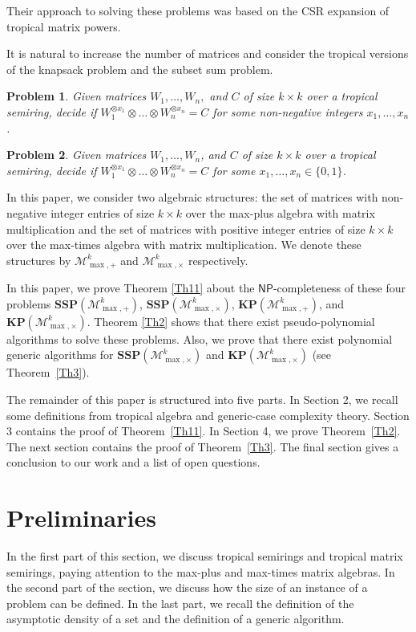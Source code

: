 \documentclass[reqno,12pt]{amsart}
\newtheorem{problem}{Problem}
\theoremstyle{definition}
\newcommand{\NP}{\mathsf{NP}}
\newcommand{\MP}{\mathcal{M}_{\max, {+}}^k}
\newcommand{\MT}{\mathcal{M}_{\max, {\times}}^k}
\newcommand{\SSMPP}{\mathbf{SSP}(\MP)}
\newcommand{\SSMTP}{\mathbf{SSP}(\MT)}
\newcommand{\KMPP}{\mathbf{KP}(\MP)}
\newcommand{\KMTP}{\mathbf{KP}(\MT)}
\begin{document}
Their approach to solving these problems was based on the CSR expansion of tropical matrix powers.

It is natural to increase the number of matrices and consider the tropical versions of the knapsack problem and the subset sum problem.

\begin{problem}\label{TropicalKnapsack}
    Given matrices $W_1, \ldots, W_n,$ and $C$ of size $k \times k$ over a tropical semiring, decide if $W_1^{\otimes x_1} \otimes \ldots \otimes  W_n^{\otimes x_n} = C$ for some non-negative integers $x_1, \ldots, x_n$.
\end{problem}

\begin{problem}\label{TropicalSubsetSum}
    Given matrices $W_1, \ldots, W_n$, and $C$ of size $k \times k$ over a tropical semiring, decide if $W_1^{\otimes x_1} \otimes \ldots \otimes  W_n^{\otimes x_n} = C$ for some $x_1, \ldots, x_n \in \{0, 1\}$.
\end{problem}

In this paper, we consider two algebraic structures: the set of matrices with non-negative integer entries of size $k\times k$ over the max-plus algebra with matrix multiplication and the set of matrices with positive integer entries of size $k\times k$ over the max-times algebra with matrix multiplication. 
We denote these structures by $\MP$ and $\MT$ respectively.

In this paper, we prove Theorem \ref{Th11} about the $\NP$-completeness of these four problems $\SSMPP$, $\SSMTP$, $\KMPP$, and $\KMTP$.
Theorem \ref{Th2} shows that there exist pseudo-polynomial algorithms to solve these problems. 
Also, we prove that there exist polynomial generic algorithms for $\SSMTP$ and $\KMTP$ (see Theorem~\ref{Th3}).

The remainder of this paper is structured into five parts. In Section 2, we recall some definitions from tropical algebra and generic-case complexity theory. Section 3 contains the proof of Theorem~\ref{Th11}. In Section 4, we prove Theorem~\ref{Th2}.
The next section contains the proof of Theorem~\ref{Th3}.
The final section gives a conclusion to our work and a list of open questions.


\section{Preliminaries}

In the first part of this section, we discuss tropical semirings and tropical matrix semirings, paying attention to the max-plus and max-times matrix algebras. In the second part of the section, we discuss how the size of an instance of a problem can be defined. 
In the last part, we recall the definition of the asymptotic density of a set and the definition of a generic algorithm.
\end{document}
